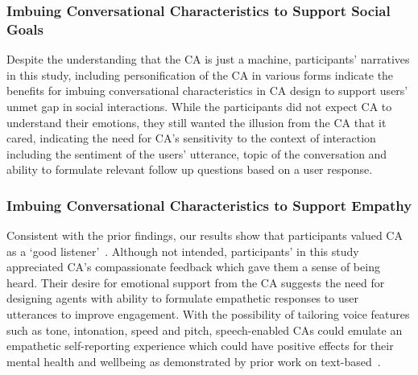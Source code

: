         \subsubsection{Imbuing Conversational Characteristics to Support Social Goals}
            Despite the understanding that the \ac{CA} is just a machine, participants' narratives in this study, including personification of the \ac{CA} in various forms indicate the benefits for imbuing conversational characteristics in \ac{CA} design to support users' unmet gap in social interactions. While the participants did not expect \ac{CA} to understand their emotions, they still wanted the illusion from the \ac{CA} that it cared, indicating the need for \ac{CA}'s sensitivity to the context of interaction including the sentiment of the users' utterance, topic of the conversation and ability to formulate relevant follow up questions based on a user response.
        
        \subsubsection{Imbuing Conversational Characteristics to Support Empathy}
            Consistent with the prior findings, our results show that participants valued \acl{CA} as a `good listener'~\cite{bauer2010introducing, clark2019makes}. Although not intended, participants' in this study appreciated \ac{CA}'s compassionate feedback which gave them a sense of being heard. Their desire for emotional support from the \ac{CA} suggests the need for designing agents with ability to formulate empathetic responses to user utterances to improve engagement. With the possibility of tailoring voice features such as tone, intonation, speed and pitch, speech-enabled \ac{CA}s could emulate an empathetic self-reporting experience which could have positive effects for their mental health and wellbeing as demonstrated by
            prior work on text-based~\cite{inkster2018empathy}. 


    
        
